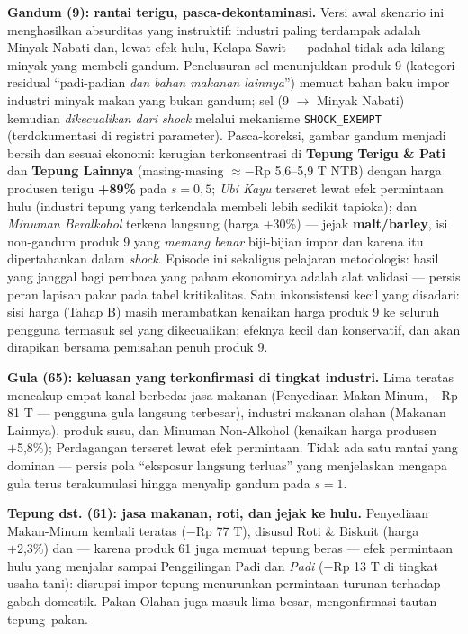 \documentclass[
  manuscript=article,
  layout=publish,
  year=2026,
  volume=1,
]{den}
\begin{document}
\textbf{Gandum (9): rantai terigu, pasca-dekontaminasi.} Versi awal
skenario ini menghasilkan absurditas yang instruktif: industri paling
terdampak adalah Minyak Nabati dan, lewat efek hulu, Kelapa Sawit ---
padahal tidak ada kilang minyak yang membeli gandum. Penelusuran sel
menunjukkan produk 9 (kategori residual ``padi-padian \emph{dan bahan
makanan lainnya}'') memuat bahan baku impor industri minyak makan yang
bukan gandum; sel (9 \(\to\) Minyak Nabati) kemudian \emph{dikecualikan
dari shock} melalui mekanisme \texttt{SHOCK\_EXEMPT} (terdokumentasi di
registri parameter). Pasca-koreksi, gambar gandum menjadi bersih dan
sesuai ekonomi: kerugian terkonsentrasi di \textbf{Tepung Terigu \&
Pati} dan \textbf{Tepung Lainnya} (masing-masing \(\approx -\)Rp
5,6--5,9 T NTB) dengan harga produsen terigu \textbf{+89\%} pada \(s =
0{,}5\); \emph{Ubi Kayu} terseret lewat efek permintaan hulu (industri
tepung yang terkendala membeli lebih sedikit tapioka); dan \emph{Minuman
Beralkohol} terkena langsung (harga +30\%) --- jejak
\textbf{malt/barley}, isi non-gandum produk 9 yang \emph{memang benar}
biji-bijian impor dan karena itu dipertahankan dalam \emph{shock}.
Episode ini sekaligus pelajaran metodologis: hasil yang janggal bagi
pembaca yang paham ekonominya adalah alat validasi --- persis peran
lapisan pakar pada tabel kritikalitas. Satu inkonsistensi kecil yang
disadari: sisi harga (Tahap B) masih merambatkan kenaikan harga produk 9
ke seluruh pengguna termasuk sel yang dikecualikan; efeknya kecil dan
konservatif, dan akan dirapikan bersama pemisahan penuh produk 9.

\textbf{Gula (65): keluasan yang terkonfirmasi di tingkat industri.}
Lima teratas mencakup empat kanal berbeda: jasa makanan (Penyediaan
Makan-Minum, \(-\)Rp 81 T --- pengguna gula langsung terbesar), industri
makanan olahan (Makanan Lainnya), produk susu, dan Minuman Non-Alkohol
(kenaikan harga produsen +5,8\%); Perdagangan terseret lewat efek
permintaan. Tidak ada satu rantai yang dominan --- persis pola
``eksposur langsung terluas'' yang menjelaskan mengapa gula terus
terakumulasi hingga menyalip gandum pada \(s = 1\).

\textbf{Tepung dst. (61): jasa makanan, roti, dan jejak ke hulu.}
Penyediaan Makan-Minum kembali teratas (\(-\)Rp 77 T), disusul Roti \&
Biskuit (harga +2,3\%) dan --- karena produk 61 juga memuat tepung beras
--- efek permintaan hulu yang menjalar sampai Penggilingan Padi dan
\emph{Padi} (\(-\)Rp 13 T di tingkat usaha tani): disrupsi impor tepung
menurunkan permintaan turunan terhadap gabah domestik. Pakan Olahan juga
masuk lima besar, mengonfirmasi tautan tepung--pakan.
\end{document}

